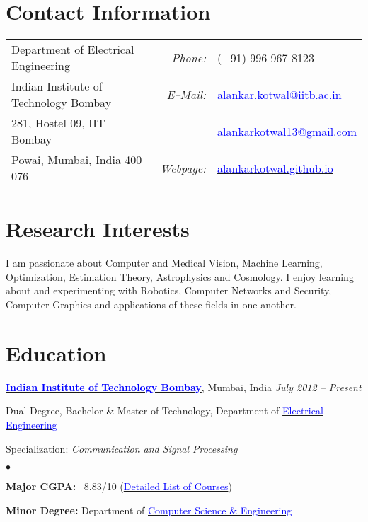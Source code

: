 \documentclass[margin,line]{res}
\newenvironment{list1}{
  \begin{list}{\ding{113}}{%
      \setlength{\itemsep}{0in}
      \setlength{\parsep}{0in} \setlength{\parskip}{0in}
      \setlength{\topsep}{0in} \setlength{\partopsep}{0in} 
      \setlength{\leftmargin}{0.17in}}}{\end{list}}
\newenvironment{list2}{
  \begin{list}{$\bullet$}{%
      \setlength{\itemsep}{0in}
      \setlength{\parsep}{0in} \setlength{\parskip}{0in}
      \setlength{\topsep}{0in} \setlength{\partopsep}{0in} 
      \setlength{\leftmargin}{0.2in}}}{\end{list}}
\begin{document}

\begin{resume}
\section{\sc Contact Information}
\vspace{.05in}
\begin{tabular}{@{}p{2.9in}p{.5in}p{3in}}
Department of Electrical Engineering & \multicolumn{1}{r}{\it Phone:}  &(+91) 996 967 8123 \\            
Indian Institute of Technology Bombay &\multicolumn{1}{r}{\it E--Mail:}& \href{mailto:alankar.kotwal@iitb.ac.in}{\textcolor{blue}{alankar.kotwal@iitb.ac.in}} \\ 
281, Hostel 09, IIT Bombay & & \href{mailto:alankarkotwal13@gmail.com}{\textcolor{blue}{alankarkotwal13@gmail.com}} \\ 
Powai, Mumbai, India 400 076 & \multicolumn{1}{r}{\it Webpage:} &\href{http://alankarkotwal.github.io/}{\textcolor{blue}{alankarkotwal.github.io}} \\     
\end{tabular}

\section{\sc Research Interests}
I am passionate about Computer and Medical Vision, Machine Learning, Optimization, Estimation Theory, Astrophysics and Cosmology. I enjoy learning about and experimenting with Robotics, Computer Networks and Security, Computer Graphics and applications of these fields in one another.

\section{\sc Education}
{\bf \href{http://www.iitb.ac.in/}{\textcolor{blue}{Indian Institute of Technology Bombay}}}, Mumbai, India \hfill {\it July 2012 -- Present} \\
\vspace*{-.1in}
\begin{list1}
\item[] Dual Degree, Bachelor \& Master of Technology, Department of \href{http://www.ee.iitb.ac.in/}{\textcolor{blue}{Electrical Engineering}}
\item[] Specialization: {\em Communication and Signal Processing}
\begin{list2}
\vspace*{.05in}
\item \textbf{Major CGPA:}  \ 8.83/10 (\hyperlink{crselst}{\textcolor{blue}{Detailed List of Courses}})
\item \textbf{Minor Degree:}  Department of \href{http://www.cse.iitb.ac.in/}{\textcolor{blue}{Computer Science \& Engineering}}
\end{list2}
\end{list1}


\end{resume}
\end{document}
